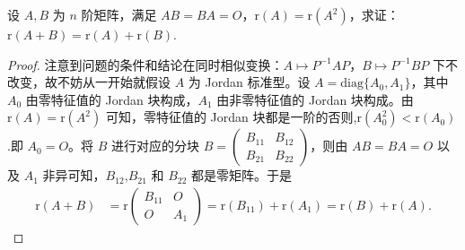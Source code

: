 \documentclass[../../main.tex]{subfiles}%
\begin{document}
\begin{proposition}\label{proposition:r(A+B)=r(A)+r(B)}
设 $A,B$ 为 $n$ 阶矩阵，满足 $AB = BA = O$，$\mathrm{r}(A) = \mathrm{r}(A^2)$，求证：$\mathrm{r}(A + B) = \mathrm{r}(A) + \mathrm{r}(B)$.
\end{proposition}
\begin{proof}

注意到问题的条件和结论在同时相似变换：$A\mapsto P^{-1}AP$，$B\mapsto P^{-1}BP$ 下不改变，故不妨从一开始就假设 $A$ 为 Jordan 标准型。设 $A = \mathrm{diag}\{A_0,A_1\}$，其中 $A_0$ 由零特征值的 Jordan 块构成，$A_1$ 由非零特征值的 Jordan 块构成。由 $\mathrm{r}(A) = \mathrm{r}(A^2)$ 可知，零特征值的 Jordan 块都是一阶的否则,$\mathrm{r}(A^2_0)<\mathrm{r}(A_0)$.即 $A_0 = O$。将 $B$ 进行对应的分块 $B = \begin{pmatrix}B_{11}&B_{12}\\B_{21}&B_{22}\end{pmatrix}$，则由 $AB = BA = O$ 以及 $A_1$ 非异可知，$B_{12}$,$B_{21}$ 和 $B_{22}$ 都是零矩阵。于是
\begin{align*}
\mathrm{r}(A + B) &= \mathrm{r}\begin{pmatrix}B_{11}&O\\O&A_1\end{pmatrix} = \mathrm{r}(B_{11}) + \mathrm{r}(A_1) = \mathrm{r}(B) + \mathrm{r}(A).
\end{align*}

\end{proof}
\end{document}
